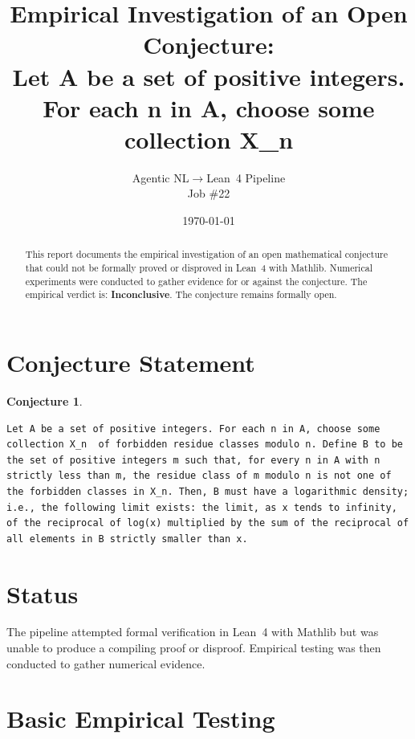 \documentclass[11pt]{article}
\title{Empirical Investigation of an Open Conjecture:\\
Let A be a set of positive integers. For each n in A, choose some collection X\_n}
\author{Agentic NL$\to$Lean~4 Pipeline \\ \small Job \#22}
\date{\today}
\newtheorem{conjecture}{Conjecture}
\begin{document}
\maketitle

\begin{abstract}
This report documents the empirical investigation of an open mathematical conjecture
that could not be formally proved or disproved in Lean~4 with Mathlib.
Numerical experiments were conducted to gather evidence for or against the conjecture.
The empirical verdict is: \textbf{\textcolor{orange!80!black}{Inconclusive}}.
The conjecture remains formally open.
\end{abstract}

\section{Conjecture Statement}

\begin{conjecture}
\begin{lstlisting}
Let A be a set of positive integers. For each n in A, choose some collection X_n  of forbidden residue classes modulo n. Define B to be the set of positive integers m such that, for every n in A with n strictly less than m, the residue class of m modulo n is not one of the forbidden classes in X_n. Then, B must have a logarithmic density; i.e., the following limit exists: the limit, as x tends to infinity, of the reciprocal of log(x) multiplied by the sum of the reciprocal of all elements in B strictly smaller than x.
\end{lstlisting}
\end{conjecture}

\section{Status}

\begin{center}
\end{center}

The pipeline attempted formal verification in Lean~4 with Mathlib but was unable to
produce a compiling proof or disproof. Empirical testing was then conducted to gather
numerical evidence.

\section{Basic Empirical Testing}
\end{document}

